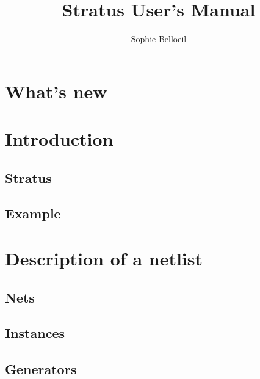 \documentclass[11pt]{article}
\date   {}
\title  {Stratus User's Manual}
\author {Sophie Belloeil}
\begin{document}
\maketitle


\tableofchildlinks
\htmlrule

\section{What's new}


\section{Introduction}
\label{secintroduction}
    
    \subsection{Stratus}
    \label{secstratus}
    
    \subsection{Example}
    \label{secexample}
    
   
\section{Description of a netlist}
\label{secnetlist}
    
    \subsection{Nets}
    \label{secnet}
    
    \subsection{Instances}
    \label{secinst}
    
    \subsection{Generators}
    \label{secgen}
    
    
\end{document}

